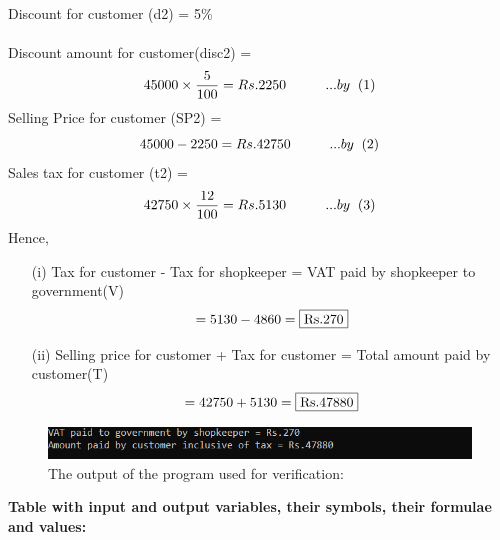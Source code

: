 \documentclass[12pt, twocolumn]{article}
\begin{document}
Discount for customer (d2) = 5\% \\ \\
Discount amount for customer(disc2)  = 
\begin{equation*} 
     45000\times\frac{5}{100} = Rs.2250 \hspace{1cm}... by \hspace{0.2cm} (1)
    \end{equation*}
Selling Price for customer (SP2) = \begin{equation*}
    45000 - 2250 =  Rs.42750 \hspace{1cm}... by \hspace{0.2cm} (2) 
\end{equation*}
Sales tax for customer (t2) = \begin{equation*}
    42750\times\frac{12}{100} = Rs.5130 \hspace{1cm}... by \hspace{0.2cm} (3)
\end{equation*} 
Hence,
\begin{enumerate}
\item[(i)]Tax for customer - Tax for shopkeeper = 
    VAT paid by shopkeeper to government(V)  
     \begin{equation*}
        = 5130 - 4860 = \fbox{Rs.270}
     \end{equation*}
\item[(ii)]Selling price for customer + Tax for customer = Total amount paid by customer(T) 
    \begin{equation*}
       = 42750 + 5130 = \fbox{Rs.47880}
   \end{equation*} 
\end{enumerate}
\begin{figure}[ht!]
     \setlength{\belowcaptionskip}{0.25cm}
     \caption{ The output of the program used for verification:}
     \label{fig:Figure 1}
     \centering
     \includegraphics[scale = 1.1]{codeoutput.png}
\end{figure}
\begin{table}[ht!]
\setlength{\abovecaptionskip}{-7cm}
\setlength{\belowcaptionskip}{-0.50cm}
  \caption{\textbf{Table with input and output variables, their symbols, their formulae and values:}}
    \label{table:1}
   
\end{table}
\end{document}
